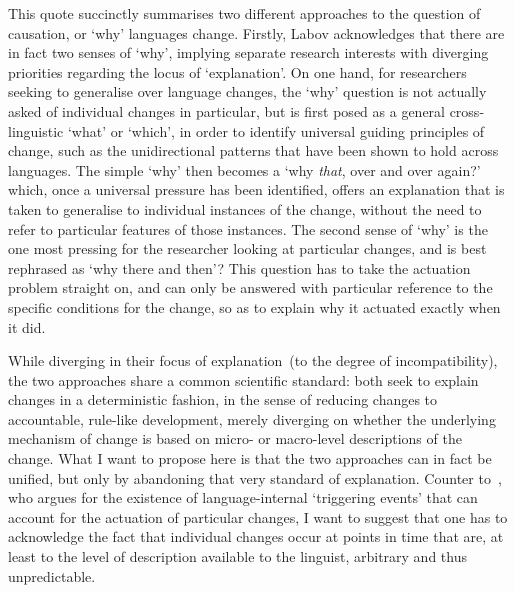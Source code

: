This quote succinctly summarises two different approaches to the question of causation, or `why' languages change. Firstly, Labov acknowledges that there are in fact two senses of `why', implying separate research interests with diverging priorities regarding the locus of `explanation'. On one hand, for researchers seeking to generalise over language changes, the `why' question is not actually asked of individual changes in particular, but is first posed as a general cross-linguistic `what' or `which', in order to identify universal guiding principles of change, such as the unidirectional patterns that have been shown to hold across languages. The simple `why' then becomes a `why \emph{that}, over and over again?' which, once a universal pressure has been identified, offers an explanation that is taken to generalise to individual instances of the change, without the need to refer to particular features of those instances. The second sense of `why' is the one most pressing for the researcher looking at particular changes, and is best rephrased as `why there and then'? This question has to take the actuation problem straight on, and can only be answered with particular reference to the specific conditions for the change, so as to explain why it actuated exactly when it did.

While diverging in their focus of explanation~(to the degree of incompatibility), the two approaches share a common scientific standard: both seek to explain changes in a deterministic fashion, in the sense of reducing changes to accountable, rule-like development, merely diverging on whether the underlying mechanism of change is based on micro- or macro-level descriptions of the change. What I want to propose here is that the two approaches can in fact be unified, but only by abandoning that very standard of explanation.
Counter to~\citet[ch.5]{Labov2010}, who argues for the existence of language-internal `triggering events' that can account for the actuation of particular changes, I want to suggest that one has to acknowledge the fact that individual changes occur at points in time that are, at least to the level of description available to the linguist, arbitrary and thus unpredictable.

